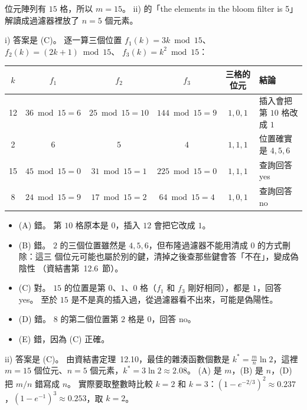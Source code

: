 \begin{pastsoln}
位元陣列有 $15$ 格，所以 $m = 15$。 ii) 的「the elements in the bloom filter is 5」解讀成過濾器裡放了
$n = 5$ 個元素。

i) 答案是 (C)。 逐一算三個位置 $f_1(k) = 3k \bmod 15$、$f_2(k) = (2k + 1) \bmod 15$、
$f_3(k) = k^2 \bmod 15$：
\begin{center}
\small
\begin{tabular}{cccccl}
\toprule
$k$ & $f_1$ & $f_2$ & $f_3$ & 三格的位元 & 結論 \\
\midrule
12 & $36 \bmod 15 = 6$ & $25 \bmod 15 = 10$ & $144 \bmod 15 = 9$ & $1, 0, 1$ & 插入會把第 $10$ 格改成 $1$ \\
2 & $6$ & $5$ & $4$ & $1, 1, 1$ & 位置確實是 $4, 5, 6$ \\
15 & $45 \bmod 15 = 0$ & $31 \bmod 15 = 1$ & $225 \bmod 15 = 0$ & $1, 1, 1$ & 查詢回答 yes \\
8 & $24 \bmod 15 = 9$ & $17 \bmod 15 = 2$ & $64 \bmod 15 = 4$ & $1, 0, 1$ & 查詢回答 no \\
\bottomrule
\end{tabular}
\end{center}
\begin{itemize}
\item (A) 錯。 第 $10$ 格原本是 $0$，插入 $12$ 會把它改成 $1$。
\item (B) 錯。 $2$ 的三個位置雖然是 $4, 5, 6$，但布隆過濾器不能用清成 $0$ 的方式刪除：這三
個位元可能也屬於別的鍵，清掉之後查那些鍵會答「不在」，變成偽陰性
（資結書第~12.6~節）。
\item (C) 對。 $15$ 的位置是第 $0$、$1$、$0$ 格（$f_1$ 和 $f_3$ 剛好相同），都是 $1$，回答
yes。 至於 $15$ 是不是真的插入過，從過濾器看不出來，可能是偽陽性。
\item (D) 錯。 $8$ 的第二個位置第 $2$ 格是 $0$，回答 no。
\item (E) 錯，因為 (C) 正確。
\end{itemize}

ii) 答案是 (C)。 由資結書定理~12.10，最佳的雜湊函數個數是
$k^{*} = \frac{m}{n}\ln 2$，這裡 $m = 15$ 個位元、$n = 5$ 個元素，$k^{*} = 3 \ln 2 \approx
2.08$。 (A) 是 $m$，(B) 是 $n$，(D) 把 $m/n$ 錯寫成 $n$。 實際要取整數時比較 $k = 2$ 和
$k = 3$：$(1 - e^{-2/3})^2 \approx 0.237$，$(1 - e^{-1})^3 \approx 0.253$，取 $k = 2$。
\end{pastsoln}
